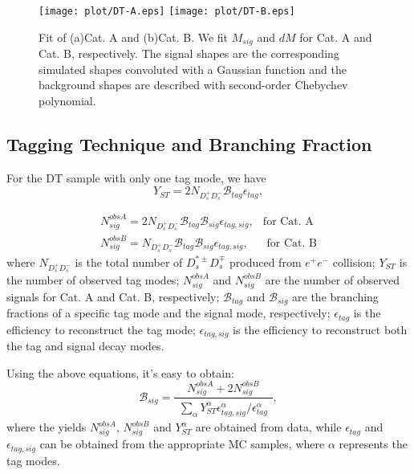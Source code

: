 \documentclass[aps,prd,twocolumn,showpacs,amsmath,amssymb]{revtex4-1}
\begin{document}
\begin{figure}[!htbp]
    \centering
    \texttt{[image: plot/DT-A.eps]}
    \texttt{[image: plot/DT-B.eps]}
    \caption{Fit of (a)Cat. A and (b)Cat. B.
        We fit $M_{sig}$ and $dM$ for Cat. A and Cat. B, respectively. The signal shapes are the corresponding simulated shapes convoluted with a Gaussian function and 
    the background shapes are described with second-order Chebychev polynomial.}
    \label{DT-fit}
\end{figure}
\subsection{Tagging Technique and Branching Fraction}
For the DT sample with only one tag mode, we have
\begin{equation}
    Y_{ST} = 2N_{D_{s}^{+}D_{s}^{-}}\mathcal{B}_{tag}\epsilon_{tag}, \label{eq-ST}
\end{equation}

\begin{equation}
    \begin{array}{lr}
        N_{sig}^{obsA}=2N_{D_{s}^{+}D_{s}^{-}}\mathcal{B}_{tag}\mathcal{B}_{sig}\epsilon_{tag,sig}  , &\text{for Cat. A} \\
        N_{sig}^{obsB}=N_{D_{s}^{+}D_{s}^{-}}\mathcal{B}_{tag}\mathcal{B}_{sig}\epsilon_{tag,sig}  ,  &\text{  for Cat. B}  
    \end{array}
    \label{eq-DT}
\end{equation}
where $N_{D_{s}^{+}D_{s}^{-}}$ is the total number of $D_{s}^{*\pm}D_{s}^{\mp}$ produced from $e^{+}e^{-}$ collision; $Y_{ST}$ is the number of observed tag modes; $N_{sig}^{obsA}$ and $N_{sig}^{obsB}$ are the number of observed signals for Cat. A and Cat. B, respectively; $\mathcal{B}_{tag}$ and $\mathcal{B}_{sig}$ are the branching fractions of a specific tag mode and the signal mode, respectively; $\epsilon_{tag}$ is the efficiency to reconstruct the tag mode; $\epsilon_{tag,sig}$ is the efficiency to reconstruct both the tag and signal decay modes.

Using the above equations, it's easy to obtain:
\begin{equation}
\mathcal{B}_{sig} = \frac{N_{sig}^{obsA}+2N_{sig}^{obsB}}{\begin{matrix}\sum_{\alpha} Y_{ST}^{\alpha}\epsilon_{tag,sig}^{\alpha}/\epsilon_{tag}^{\alpha}\end{matrix}}, \label{BR-formula}
\end{equation}
where the yields $N_{sig}^{obsA}$, $N_{sig}^{obsB}$ and $Y_{ST}^{\alpha}$ are obtained from data, while $\epsilon_{tag}$ and $\epsilon_{tag,sig}$ can be obtained from the appropriate MC samples, where $\alpha$ represents the tag modes.
\end{document}
